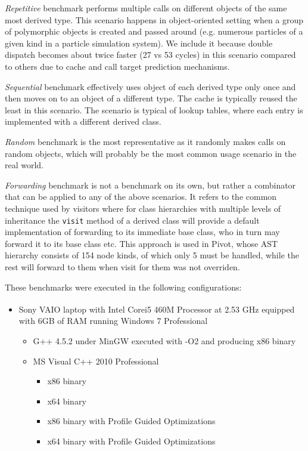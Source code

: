 \documentclass[preprint]{sigplanconf}
\makeatletter
\DeclareRobustCommand{\code}[1]{{\lstinline[breaklines=false,escapechar=@]{#1}}}
\makeatother
\begin{document}
\emph{Repetitive} benchmark performs multiple calls on different objects of the 
same most derived type. This scenario happens in object-oriented setting when a 
group of polymorphic objects is created and passed around (e.g. numerous 
particles of a given kind in a particle simulation system). We include it 
because double dispatch becomes about twice faster (27 vs 53 cycles) in this 
scenario compared to others due to cache and call target prediction mechanisms. 

\emph{Sequential} benchmark effectively uses object of each derived type only 
once and then moves on to an object of a different type. The cache is typically 
reused the least in this scenario. The scenario is typical of lookup tables, 
where each entry is implemented with a different derived class.

\emph{Random} benchmark is the most representative as it randomly makes calls on 
random objects, which will probably be the most common usage scenario in the 
real world.

\emph{Forwarding} benchmark is not a benchmark on its own, but rather a 
combinator that can be applied to any of the above scenarios. It refers to the 
common technique used by visitors where for class hierarchies with multiple 
levels of inheritance the \code{visit} method of a derived class will provide a 
default implementation of forwarding to its immediate base class, who in turn 
may forward it to its base class etc. This approach is used in Pivot, whose AST 
hierarchy consists of 154 node kinds, of which only 5 must be handled, while the 
rest will forward to them when visit for them was not overriden.

These benchmarks were executed in the following configurations:

\begin{itemize}
\item Sony VAIO\textsuperscript{\textregistered} laptop with Intel\textsuperscript{\textregistered} Core\texttrademark i5 460M 
      Processor at 2.53 GHz equipped with 6GB of RAM running Windows 7 
      Professional
      \begin{itemize}
      \item G++ 4.5.2 under MinGW executed with -O2 and producing x86 binary
      \item MS Visual C++ 2010 Professional
            \begin{itemize}
            \item x86 binary
            \item x64 binary
            \item x86 binary with Profile Guided Optimizations
            \item x64 binary with Profile Guided Optimizations
            \end{itemize}
      \end{itemize}
\end{itemize}
\end{document}
